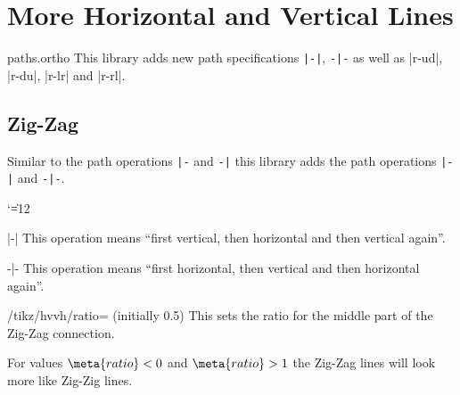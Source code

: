 %
%
%

\section{More Horizontal and Vertical Lines}
\label{library:paths.ortho}

\begin{tikzlibrary}{paths.ortho}
  This library adds new path specifications \verb!|-|!, \verb!-|-! as well as
  |r-ud|, |r-du|, |r-lr| and |r-rl|.
\end{tikzlibrary}

\subsection{Zig-Zag}
Similar to the path operations \verb!|-! and \verb!-|! this library adds
the path operations \verb!|-|! and \verb!-|-!.
{\catcode`\|=12
\begin{pathoperation}[noindex]{|-|}{}
    \pgfmanualpdflabel[\catcode`\|=12 ]{|-|}{}%
    This operation means ``first vertical, then horizontal and then vertical again''.
\end{pathoperation}
\begin{pathoperation}[noindex]{-|-}{}
    \pgfmanualpdflabel[\catcode`\|=12 ]{-|-}{}%
    This operation means ``first horizontal, then vertical and then horizontal again''.
\end{pathoperation}
}
\begin{key}{/tikz/hvvh/ratio= (initially 0.5)}
  This sets the ratio for the middle part of the Zig-Zag connection.
  
  For values $\meta{ratio} < 0$ and $\meta{ratio} > 1$ the Zig-Zag lines will
  look more like Zig-Zig lines.
  \begin{codeexample}[preamble=\usetikzlibrary{paths.ortho}]
  \end{codeexample}
\end{key}
